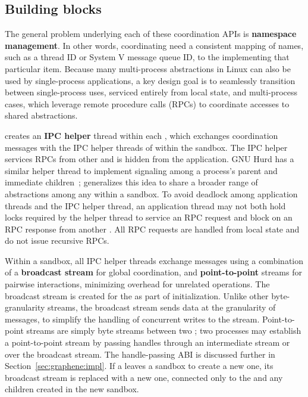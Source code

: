 \subsection{Building blocks}
\label{sec:libos:namespaces:blocks}

The general problem underlying each of these coordination APIs is 
{\bf namespace management}.  In other words, coordinating \picoprocs{} need 
a consistent mapping of names, such as a thread ID or System V message queue ID, 
to the \picoproc{} implementing that particular item.  
Because many multi-process abstractions in Linux can also be used by single-process applications,
a key design goal is to seamlessly transition between single-process uses, serviced 
entirely from local \libos{} state, and multi-process cases, which
leverage remote procedure calls (RPCs) to coordinate accesses to shared abstractions.


\graphene{} creates an  {\bf IPC helper} thread within each \picoproc{},
which exchanges coordination messages with the IPC helper threads of \picoprocs{} 
within the sandbox. %
The IPC helper
services RPCs from other \picoprocs{} and is
hidden from the application. 
GNU Hurd has a similar helper thread to implement signaling among a process's parent and
immediate children~\cite{hurd};
\graphene{} generalizes this idea to share a broader range of abstractions among any \picoprocs{}
within a sandbox.
To avoid deadlock among application threads and the IPC helper thread, 
an application thread may not both hold locks required by the helper thread to service an RPC request
and block
on an RPC response from another \picoproc{}.
All RPC requests are handled from local state and do not issue recursive RPCs.%

Within a sandbox, all IPC helper threads exchange messages using a
combination of a {\bf broadcast stream} for global coordination,
and {\bf point-to-point} streams for pairwise interactions, 
minimizing overhead for unrelated operations.
The broadcast stream is created for the \picoproc{} as part of initialization.
Unlike other byte-granularity streams, the broadcast stream sends data at the granularity of messages,
to simplify the handling of concurrent writes to the stream.
Point-to-point streams are simply byte streams between two \picoprocs{};
two processes may establish a point-to-point stream by passing handles through 
an intermediate stream or over the broadcast stream.
The handle-passing ABI is discussed further in Section~\ref{sec:graphene:impl}.
If a \picoproc{} leaves a sandbox to create a new one,
its broadcast stream is replaced
with a new one, connected only to the \picoproc{} and any children created in the
new sandbox.

